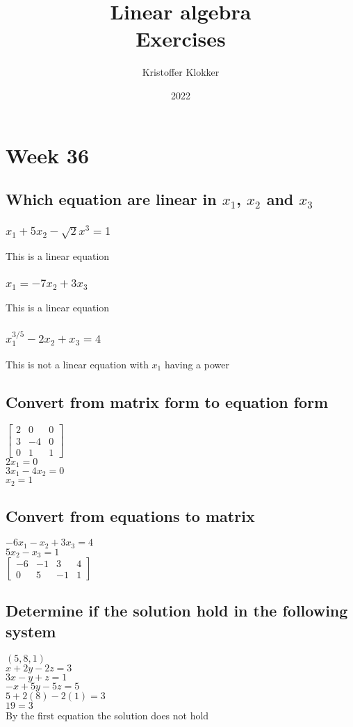 \documentclass[12pt, a4paper]{article}
\title{Linear algebra\\ Exercises}
\date{2022}
\author{Kristoffer Klokker}
\begin{document}
	\maketitle
	\clearpage
	\tableofcontents
	\clearpage
	\section{Week 36}
		\subsection{Which equation are linear in $x_1$, $x_2$ and $x_3$}
			\subsubsection{$x_1+5x_2-\sqrt{2}x^3=1$}
				This is a linear equation
			\subsubsection{$x_1=-7x_2+3x_3$}
				This is a linear equation
			\subsubsection{$x_1^{3/5}-2x_2+x_3=4$}
				This is not a linear equation with $x_1$ having a power
		\subsection{Convert from matrix form to equation form}
			$\begin{bmatrix}
				2 & 0 & 0 \\
				3 & -4 & 0\\
				0 & 1 & 1 
			\end{bmatrix}$\\
			$2x_1=0$\\
			$3x_1-4x_2=0$\\
			$x_2=1$
		\subsection{Convert from equations to matrix}
			$-6x_1-x_2+3x_3=4$\\
			$5x_2-x_3=1$\\
			$\begin{bmatrix}
				-6 & -1 & 3 & 4 \\
				0 & 5 & -1 & 1
			\end{bmatrix}$
		\subsection{Determine if the solution hold in the following system}
			$(5,8,1)$\\
			$x+2y-2z=3$\\
			$3x-y+z=1$\\
			$-x+5y-5z=5$\\[4mm]
			$5+2(8)-2(1)=3$\\
			$19=3$\\
			By the first equation the solution does not hold
\end{document}
